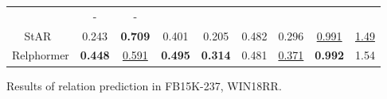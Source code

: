 \documentclass[sigconf]{acmart}
\begin{document}
\begin{table*}[htbp!]
{\begin{tabular}{c|rrr|rrr|rr}
          
           &\multicolumn{1}{c}{-} 
           & \multicolumn{1}{c}{-} \\
          
          
           
           
             \multicolumn{1}{c|}{StAR~\cite{StAR}}
             & \multicolumn{1}{c}{0.243} 
             & \multicolumn{1}{c}{\textbf{0.709}} 
             & \multicolumn{1}{c|}{0.401}
             
             &\multicolumn{1}{c}{0.205} 
           &\multicolumn{1}{c}{0.482} 
           & \multicolumn{1}{c|}{0.296}
           


           
           &\multicolumn{1}{c}{\underline{0.991}} 
           & \multicolumn{1}{c}{\underline{1.49}} \\
          
             \midrule
        
            \multicolumn{1}{c|}{{{Relphormer}}} 
            & \multicolumn{1}{c}{\textbf{0.448}}
            & \multicolumn{1}{c}{\underline{0.591}} 
            & \multicolumn{1}{c|}{\textbf{0.495}}
            
           &\multicolumn{1}{c}{\textbf{0.314}} 
           &\multicolumn{1}{c}{{{0.481}}}
           & \multicolumn{1}{c|}{\underline{0.371}}
           


           
           &\multicolumn{1}{c}{\textbf{0.992}} 
           & \multicolumn{1}{c}{1.54} \\
        
            \bottomrule
            \end{tabular}
            
            }

        
            
        \label{tab:link_prediction}
        \end{table*} \begin{table}[htbp!]
        
        \caption{Results of relation prediction in FB15K-237, WIN18RR. 
            \label{tab:relation_prediction}
        }
        

\end{table}
\end{document}
